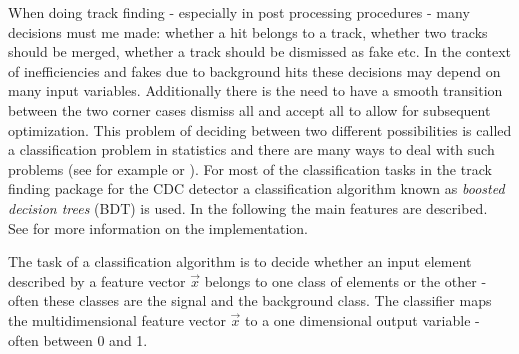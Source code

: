 When doing track finding - especially in post processing procedures - many decisions must me made: whether a hit belongs to a track, whether two tracks should be merged, whether a track should be dismissed as fake etc. In the context of inefficiencies and fakes due to background hits these decisions may depend on many input variables. Additionally there is the need to have a smooth transition between the two corner cases dismiss all and accept all to allow for subsequent optimization. This problem of deciding between two different possibilities is called a classification problem in statistics and there are many ways to deal with such problems (see for example \cite{cowan} or \cite{blobel}). For most of the classification tasks in the track finding package for the CDC detector a classification algorithm known as \emph{boosted decision trees} (BDT) is used. In the following the main features are described. See \cite{keck} for more information on the implementation.

The task of a classification algorithm is to decide whether an input element described by a feature vector $\vec x$ belongs to one class of elements or the other - often these classes are the signal and the background class. The classifier maps the multidimensional feature vector $\vec x$ to a one dimensional output variable - often between 0 and 1. 
